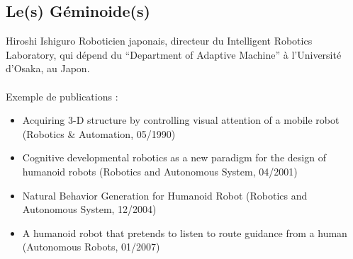 \documentclass{beamer}
\begin{document}
\subsection{Le(s) Géminoide(s)}
\begin{frame}{Hiroshi Ishiguro}
  Roboticien japonais, directeur du Intelligent Robotics Laboratory, 
  qui dépend du ``Department of Adaptive Machine'' à l'Université d'Osaka, 
  au Japon.\\~\\
  Exemple de publications :
  \begin{itemize}
  \item Acquiring 3-D structure by controlling visual attention of a mobile 
    robot (Robotics \& Automation, 05/1990)
  \item Cognitive developmental robotics as a new paradigm for the design 
    of humanoid robots (Robotics and Autonomous System, 04/2001)
  \item Natural Behavior Generation for Humanoid Robot (Robotics and Autonomous System, 12/2004)
  \item  A humanoid robot that pretends to listen to route guidance from a 
    human (Autonomous Robots, 01/2007)
  \end{itemize}
\end{frame}
\end{document}
